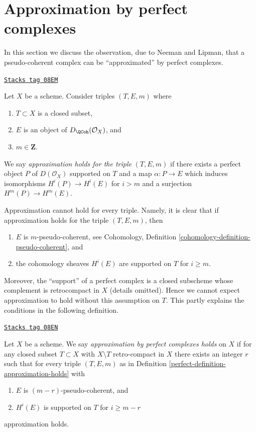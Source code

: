 \section{Approximation by perfect complexes}
\label{perfect-section-approximation}
In this section we discuss the observation, due to Neeman and Lipman,
that a pseudo-coherent complex can be ``approximated'' by perfect complexes.

\begin{definition}
\label{perfect-definition-approximation-holds}
\href{https://stacks.math.columbia.edu/tag/08EM}{\texttt{Stacks tag 08EM}}

Let $X$ be a scheme. Consider triples $(T, E, m)$ where
\begin{enumerate}
\item $T \subset X$ is a closed subset,
\item $E$ is an object of $D_\QCoh(\mathcal{O}_X)$, and
\item $m \in \mathbf{Z}$.
\end{enumerate}
We say {\it approximation holds for the triple} $(T, E, m)$ if
there exists a perfect object $P$ of $D(\mathcal{O}_X)$ supported on $T$
and a map $\alpha : P \to E$ which induces isomorphisms $H^i(P) \to H^i(E)$
for $i > m$ and a surjection $H^m(P) \to H^m(E)$.
\end{definition}

Approximation cannot hold for every triple. Namely, it is clear that if
approximation holds for the triple $(T, E, m)$, then
\begin{enumerate}
\item $E$ is $m$-pseudo-coherent, see
Cohomology, Definition \ref{cohomology-definition-pseudo-coherent}, and
\item the cohomology sheaves $H^i(E)$ are supported on $T$ for $i \geq m$.
\end{enumerate}
Moreover, the ``support'' of a perfect complex is a closed subscheme
whose complement is retrocompact in $X$ (details omitted). Hence we cannot
expect approximation to hold without this assumption on $T$.
This partly explains the conditions in the following definition.

\begin{definition}[Approximation]
\label{perfect-definition-approximation}
\href{https://stacks.math.columbia.edu/tag/08EN}{\texttt{Stacks tag 08EN}}

Let $X$ be a scheme. We say {\it approximation by perfect complexes holds}
on $X$ if for any closed subset $T \subset X$ with $X \setminus T$
retro-compact in $X$ there exists an integer $r$ such that
for every triple $(T, E, m)$ as in
Definition \ref{perfect-definition-approximation-holds} with
\begin{enumerate}
\item $E$ is $(m - r)$-pseudo-coherent, and
\item $H^i(E)$ is supported on $T$ for $i \geq m - r$
\end{enumerate}
approximation holds.
\end{definition}

